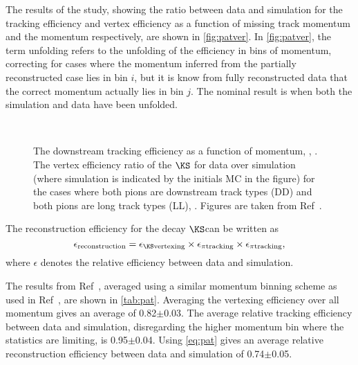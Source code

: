 The results of the study, showing the ratio between data and simulation for the tracking efficiency and vertex efficiency as a function of missing track momentum and the \KS momentum respectively, are shown in \autoref{fig:patver}. In \autoref{fig:patver}, the term unfolding refers to the unfolding of the efficiency in bins of momentum, correcting for cases where the momentum inferred from the partially reconstructed case lies in bin $i$, but it is know from fully reconstructed data that the correct momentum actually lies in bin $j$. The nominal result is when both the simulation and data have been unfolded.
\begin{figure}[h]
  \centering
\\
\caption{The downstream tracking efficiency as a function of momentum, \protect{}, \protect{}. The vertex efficiency ratio of the $\KS$ for data over simulation (where simulation is indicated by the initials MC in the figure) for the cases where both pions are downstream track types (\Gls{DD}) and both pions are long track types (\Gls{LL}), \protect{}. Figures are taken from Ref~\cite{DDpat}.}
\label{fig:patver}
\end{figure}
The reconstruction efficiency for the decay $\KS$\to\pip\pim can be written as
\begin{equation}
  \epsilon_{\mathrm{reconstruction}} = \epsilon_{\mathrm{\KS vertexing}}\times\epsilon_{\pi\mathrm{ tracking}}\times\epsilon_{\pi\mathrm{ tracking}},
  \label{eq:pat}
\end{equation}  
where $\epsilon$ denotes the relative efficiency between data and simulation.%

The results from Ref~\cite{DDpat}, averaged using a similar momentum binning scheme as used in Ref~\cite{LHCB-DP-2013-002}, are shown in \autoref{tab:pat}. Averaging the vertexing efficiency over all \KS momentum gives an average of 0.82$\pm$0.03. The average relative tracking efficiency between data and simulation, disregarding the higher momentum bin where the statistics are limiting, is 0.95$\pm$0.04. Using \autoref{eq:pat} gives an average relative reconstruction efficiency between data and simulation of 0.74$\pm$0.05. 

